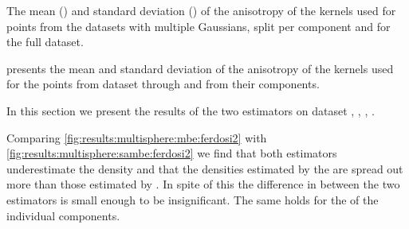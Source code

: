 	\begin{table*}
		\centering
		
		\caption{The mean (\mean) and standard deviation (\SD) of the anisotropy of the kernels used for points from the datasets with multiple Gaussians, split per component and for the full dataset.} 	
		\label{tab:results:multiSphere:anisotropy}
	\end{table*}
	 presents the mean and standard deviation of the anisotropy of the kernels used for the points from dataset \ferdosiTwo through \baakmanThree and from their components. 
	














\oldStuff

	In this section we present the results of the two estimators on dataset \ferdosiTwo, \baakmanTwo, \ferdosiThree, \baakmanThree.

	Comparing \cref{fig:results:multisphere:mbe:ferdosi2} with \cref{fig:results:multisphere:sambe:ferdosi2} we find that both estimators underestimate the density and that the densities estimated by the \sambe are spread out more than those estimated by \mbe. In spite of this the difference in \mse between the two estimators is small enough to be insignificant. 
	The same holds for the \mse of the individual components.

